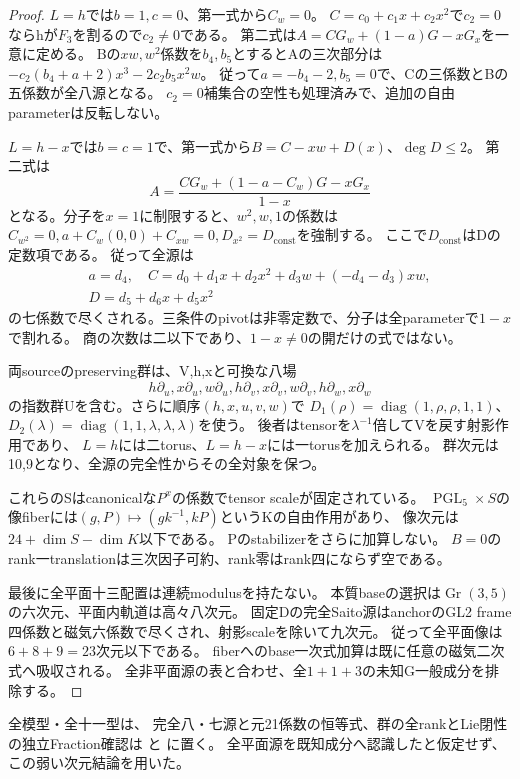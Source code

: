 \documentclass[a4paper,11pt]{ltjsarticle}
\theoremstyle{definition}
\newcommand{\PGL}{\operatorname{PGL}}
\begin{document}
\begin{proof}
$L=h$では$b=1,c=0$、第一式から$C_w=0$。
$C=c_0+c_1x+c_2x^2$で$c_2=0$ならhが$F_3$を割るので$c_2\ne0$である。
第二式は$A=CG_w+(1-a)G-xG_x$を一意に定める。
Bの$xw,w^2$係数を$b_4,b_5$とするとAの三次部分は
$-c_2(b_4+a+2)x^3-2c_2b_5x^2w$。
従って$a=-b_4-2,b_5=0$で、Cの三係数とBの五係数が全八源となる。
$c_2=0$補集合の空性も処理済みで、追加の自由parameterは反転しない。

$L=h-x$では$b=c=1$で、第一式から$B=C-xw+D(x)$、$\deg D\le2$。
第二式は
\[
 A=\frac{CG_w+(1-a-C_w)G-xG_x}{1-x}
\]
となる。分子を$x=1$に制限すると、$w^2,w,1$の係数は
$C_{w^2}=0,a+C_w(0,0)+C_{xw}=0,D_{x^2}=D_{\mathrm{const}}$を強制する。
ここで$D_{\mathrm{const}}$はDの定数項である。
従って全源は
\[
 \begin{gathered}
 a=d_4,\quad C=d_0+d_1x+d_2x^2+d_3w+(-d_4-d_3)xw,\\
 D=d_5+d_6x+d_5x^2
 \end{gathered}
\]
の七係数で尽くされる。三条件のpivotは非零定数で、分子は全parameterで$1-x$で割れる。
商の次数は二以下であり、$1-x\ne0$の開だけの式ではない。

両sourceのpreserving群は、V,h,xと可換な八場
\[
 h\partial_u,x\partial_u,w\partial_u,h\partial_v,x\partial_v,w\partial_v,
 h\partial_w,x\partial_w
\]
の指数群Uを含む。さらに順序$(h,x,u,v,w)$で
$D_1(\rho)=\operatorname{diag}(1,\rho,\rho,1,1)$、
$D_2(\lambda)=\operatorname{diag}(1,1,\lambda,\lambda,\lambda)$を使う。
後者はtensorを$\lambda^{-1}$倍してVを戻す射影作用であり、
$L=h$には二torus、$L=h-x$には一torusを加えられる。
群次元は10,9となり、全源の完全性からその全対象を保つ。

これらのSはcanonicalな$P^x$の係数でtensor scaleが固定されている。
$\PGL_5\times S$の像fiberには$(g,P)\mapsto(gk^{-1},kP)$というKの自由作用があり、
像次元は$24+\dim S-\dim K$以下である。
Pのstabilizerをさらに加算しない。
$B=0$のrank一translationは三次因子可約、rank零はrank四にならず空である。

最後に全平面十三配置は連続modulusを持たない。
本質baseの選択は$\operatorname{Gr}(3,5)$の六次元、平面内軌道は高々八次元。
固定Dの完全Saito源はanchorのGL2 frame四係数と磁気六係数で尽くされ、射影scaleを除いて九次元。
従って全平面像は$6+8+9=23$次元以下である。
fiberへのbase一次式加算は既に任意の磁気二次式へ吸収される。
全非平面源の表と合わせ、全$1+1+3$の未知G一般成分を排除する。
\end{proof}
全模型・全十一型は、
完全八・七源と元21係数の恒等式、群の全rankとLie閉性の独立Fraction確認は
と
に置く。
全平面源を既知成分へ認識したと仮定せず、この弱い次元結論を用いた。
\end{document}
